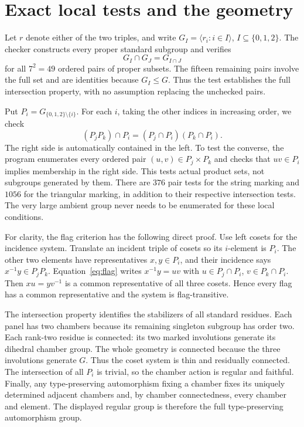 \documentclass[11pt]{article}
\begin{document}
\section{Exact local tests and the geometry}
Let $r$ denote either of the two triples, and write $G_I=\langle r_i:i\in I\rangle$, $I\subseteq\{0,1,2\}$. The checker constructs every proper standard subgroup and verifies
\begin{equation}\label{eq:ip}
 G_I\cap G_J=G_{I\cap J}
\end{equation}
for all $7^2=49$ ordered pairs of proper subsets. The fifteen remaining pairs involve the full set and are identities because $G_I\leq G$. Thus the test establishes the full intersection property, with no assumption replacing the unchecked pairs.

Put $P_i=G_{\{0,1,2\}\setminus\{i\}}$. For each $i$, taking the other indices in increasing order, we check
\begin{equation}\label{eq:flag}
 (P_jP_k)\cap P_i=(P_j\cap P_i)(P_k\cap P_i).
\end{equation}
The right side is automatically contained in the left. To test the converse, the program enumerates every ordered pair $(u,v)\in P_j\times P_k$ and checks that $uv\in P_i$ implies membership in the right side. This tests actual product sets, not subgroups generated by them. There are $376$ pair tests for the string marking and $1056$ for the triangular marking, in addition to their respective intersection tests. The very large ambient group never needs to be enumerated for these local conditions.

For clarity, the flag criterion has the following direct proof. Use left cosets for the incidence system. Translate an incident triple of cosets so its $i$-element is $P_i$. The other two elements have representatives $x,y\in P_i$, and their incidence says $x^{-1}y\in P_jP_k$. Equation~\eqref{eq:flag} writes $x^{-1}y=uv$ with $u\in P_j\cap P_i$, $v\in P_k\cap P_i$. Then $xu=yv^{-1}$ is a common representative of all three cosets. Hence every flag has a common representative and the system is flag-transitive.

The intersection property identifies the stabilizers of all standard residues. Each panel has two chambers because its remaining singleton subgroup has order two. Each rank-two residue is connected: its two marked involutions generate its dihedral chamber group. The whole geometry is connected because the three involutions generate $G$. Thus the coset system is thin and residually connected. The intersection of all $P_i$ is trivial, so the chamber action is regular and faithful. Finally, any type-preserving automorphism fixing a chamber fixes its uniquely determined adjacent chambers and, by chamber connectedness, every chamber and element. The displayed regular group is therefore the full type-preserving automorphism group.
\end{document}
